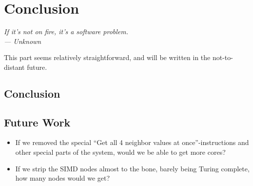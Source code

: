 \chapter{Conclusion}\label{ch:conc}

\begin{flushright}{\slshape
    If it's not on fire, it's a software problem.\\ \medskip
    --- Unknown}
\end{flushright}

This part seems relatively straightforward, and will be written in the
not-to-distant future.

\section{Conclusion}

\section{Future Work}

\begin{itemize}
\item If we removed the special ``Get all 4 neighbor values at
  once''-instructions and other special parts of the system, would we be able to
  get more cores?
\item If we strip the \ac{SIMD} nodes almost to the bone, barely being Turing
  complete, how many nodes would we get?
\end{itemize}
